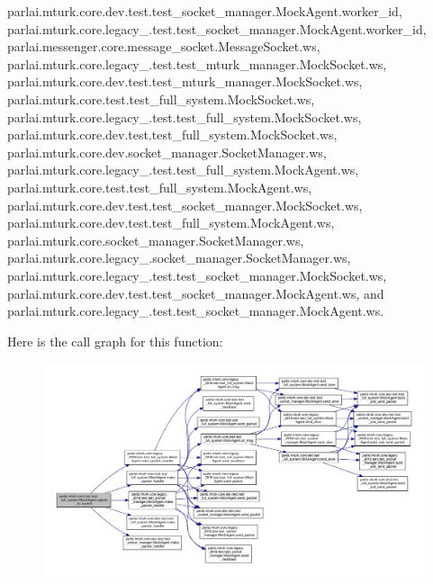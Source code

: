 parlai.\+mturk.\+core.\+dev.\+test.\+test\+\_\+socket\+\_\+manager.\+Mock\+Agent.\+worker\+\_\+id, parlai.\+mturk.\+core.\+legacy\+\_.\+test.\+test\+\_\+socket\+\_\+manager.\+Mock\+Agent.\+worker\+\_\+id, parlai.\+messenger.\+core.\+message\+\_\+socket.\+Message\+Socket.\+ws, parlai.\+mturk.\+core.\+legacy\+\_.\+test.\+test\+\_\+mturk\+\_\+manager.\+Mock\+Socket.\+ws, parlai.\+mturk.\+core.\+dev.\+test.\+test\+\_\+mturk\+\_\+manager.\+Mock\+Socket.\+ws, parlai.\+mturk.\+core.\+test.\+test\+\_\+full\+\_\+system.\+Mock\+Socket.\+ws, parlai.\+mturk.\+core.\+legacy\+\_.\+test.\+test\+\_\+full\+\_\+system.\+Mock\+Socket.\+ws, parlai.\+mturk.\+core.\+dev.\+test.\+test\+\_\+full\+\_\+system.\+Mock\+Socket.\+ws, parlai.\+mturk.\+core.\+dev.\+socket\+\_\+manager.\+Socket\+Manager.\+ws, parlai.\+mturk.\+core.\+legacy\+\_.\+test.\+test\+\_\+full\+\_\+system.\+Mock\+Agent.\+ws, parlai.\+mturk.\+core.\+test.\+test\+\_\+full\+\_\+system.\+Mock\+Agent.\+ws, parlai.\+mturk.\+core.\+dev.\+test.\+test\+\_\+socket\+\_\+manager.\+Mock\+Socket.\+ws, parlai.\+mturk.\+core.\+dev.\+test.\+test\+\_\+full\+\_\+system.\+Mock\+Agent.\+ws, parlai.\+mturk.\+core.\+socket\+\_\+manager.\+Socket\+Manager.\+ws, parlai.\+mturk.\+core.\+legacy\+\_.\+socket\+\_\+manager.\+Socket\+Manager.\+ws, parlai.\+mturk.\+core.\+legacy\+\_.\+test.\+test\+\_\+socket\+\_\+manager.\+Mock\+Socket.\+ws, parlai.\+mturk.\+core.\+dev.\+test.\+test\+\_\+socket\+\_\+manager.\+Mock\+Agent.\+ws, and parlai.\+mturk.\+core.\+legacy\+\_.\+test.\+test\+\_\+socket\+\_\+manager.\+Mock\+Agent.\+ws.

Here is the call graph for this function\+:
\nopagebreak
\begin{figure}[H]
\begin{center}
\leavevmode
\includegraphics[width=350pt]{classparlai_1_1mturk_1_1core_1_1test_1_1test__full__system_1_1MockAgent_aa3aaa3fa10d7f1ca6a135bcd28e18be4_cgraph}
\end{center}
\end{figure}
\mbox{\label{classparlai_1_1mturk_1_1core_1_1test_1_1test__full__system_1_1MockAgent_a7a0ba09a58ea21ac86db4b501c392a33}} 
